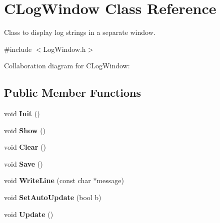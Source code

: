 \hypertarget{class_c_log_window}{\section{C\+Log\+Window Class Reference}
\label{class_c_log_window}
}


Class to display log strings in a separate window.  




{\ttfamily \#include $<$Log\+Window.\+h$>$}



Collaboration diagram for C\+Log\+Window\+:
\subsection*{Public Member Functions}
\begin{DoxyCompactItemize}
\item 
\hypertarget{class_c_log_window_a074274b0950b79721ad44725307f3f93}{void {\bfseries Init} ()}\label{class_c_log_window_a074274b0950b79721ad44725307f3f93}

\item 
\hypertarget{class_c_log_window_acb4b0768ace5bedce9d7742ac2ebd119}{void {\bfseries Show} ()}\label{class_c_log_window_acb4b0768ace5bedce9d7742ac2ebd119}

\item 
\hypertarget{class_c_log_window_ae01f51f5e163ba75699fa939ad0a8671}{void {\bfseries Clear} ()}\label{class_c_log_window_ae01f51f5e163ba75699fa939ad0a8671}

\item 
\hypertarget{class_c_log_window_a5bab43b2f48696dca67c9dbb00bfda1d}{void {\bfseries Save} ()}\label{class_c_log_window_a5bab43b2f48696dca67c9dbb00bfda1d}

\item 
\hypertarget{class_c_log_window_a9ae936353ca407a6a734d0bda1dd2850}{void {\bfseries Write\+Line} (const char $\ast$message)}\label{class_c_log_window_a9ae936353ca407a6a734d0bda1dd2850}

\item 
\hypertarget{class_c_log_window_ac941a1605e9bcc949161fb474d4e2202}{void {\bfseries Set\+Auto\+Update} (bool b)}\label{class_c_log_window_ac941a1605e9bcc949161fb474d4e2202}

\item 
\hypertarget{class_c_log_window_a78dd03dd86314caf6d45d84478330906}{void {\bfseries Update} ()}\label{class_c_log_window_a78dd03dd86314caf6d45d84478330906}

\end{DoxyCompactItemize}

